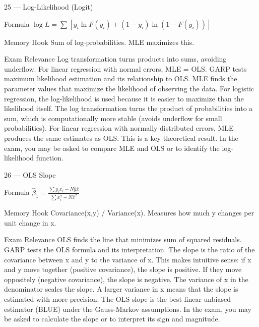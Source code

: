 \documentclass[aspectratio=169,8pt]{beamer}
\begin{document}
	\begin{frame}{25 --- Log-Likelihood (Logit)}
		\begin{block}{Formula}
			$\log L = \sum[y_i \ln F(y_i) + (1-y_i)\ln(1-F(y_i))]$
		\end{block}
		\begin{block}{Memory Hook}
			Sum of log-probabilities. MLE maximizes this.
		\end{block}
		\begin{block}{Exam Relevance}
			Log transformation turns products into sums, avoiding underflow. For linear regression with normal errors, MLE = OLS. GARP tests maximum likelihood estimation and its relationship to OLS. MLE finds the parameter values that maximize the likelihood of observing the data. For logistic regression, the log-likelihood is used because it is easier to maximize than the likelihood itself. The log transformation turns the product of probabilities into a sum, which is computationally more stable (avoids underflow for small probabilities). For linear regression with normally distributed errors, MLE produces the same estimates as OLS. This is a key theoretical result. In the exam, you may be asked to compare MLE and OLS or to identify the log-likelihood function.
		\end{block}
	\end{frame}
	
	\begin{frame}{26 --- OLS Slope}
		\begin{block}{Formula}
			$\hat{\beta}_1 = \frac{\sum y_i x_i - N\bar{y}\bar{x}}{\sum x_i^2 - N\bar{x}^2}$
		\end{block}
		\begin{block}{Memory Hook}
			Covariance(x,y) / Variance(x). Measures how much y changes per unit change in x.
		\end{block}
		\begin{block}{Exam Relevance}
			OLS finds the line that minimizes sum of squared residuals. GARP tests the OLS formula and its interpretation. The slope is the ratio of the covariance between x and y to the variance of x. This makes intuitive sense: if x and y move together (positive covariance), the slope is positive. If they move oppositely (negative covariance), the slope is negative. The variance of x in the denominator scales the slope. A larger variance in x means that the slope is estimated with more precision. The OLS slope is the best linear unbiased estimator (BLUE) under the Gauss-Markov assumptions. In the exam, you may be asked to calculate the slope or to interpret its sign and magnitude.
		\end{block}
	\end{frame}
	
\end{document}
